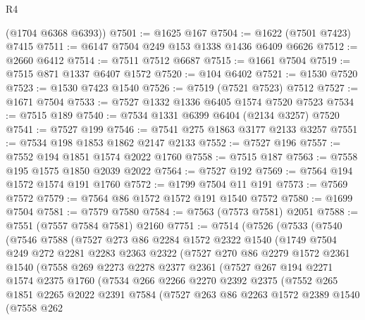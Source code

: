 \begin{lexlean}{R4}
\begin{coremodule}
      (@1704 @6368 @6393))
@7501 := @1625 @167
@7504 := @1622 (@7501 @7423) @7415
@7511 := @6147 @7504 @249 @153 @1338 @1436 @6409 @6626
@7512 := @2660 @6412
@7514 := @7511 @7512 @6687
@7515 := @1661 @7504
@7519 := @7515 @871 @1337 @6407 @1572
@7520 := @104 @6402
@7521 := @1530 @7520
@7523 := @1530 @7423 @1540
@7526 := @7519 (@7521 @7523) @7512
@7527 := @1671 @7504
@7533 := @7527 @1332 @1336 @6405 @1574 @7520 @7523
@7534 := @7515 @189
@7540 := @7534 @1331 @6399 @6404 (@2134 @3257) @7520
@7541 := @7527 @199
@7546 := @7541 @275 @1863 @3177 @2133 @3257
@7551 := @7534 @198 @1853 @1862 @2147 @2133
@7552 := @7527 @196
@7557 := @7552 @194 @1851 @1574 @2022 @1760
@7558 := @7515 @187
@7563 := @7558 @195 @1575 @1850 @2039 @2022
@7564 := @7527 @192
@7569 := @7564 @194 @1572 @1574 @191 @1760
@7572 := @1799 @7504 @11 @191
@7573 := @7569 @7572
@7579 := @7564 @86 @1572 @1572 @191 @1540 @7572
@7580 := @1699 @7504
@7581 := @7579 @7580
@7584 := @7563 (@7573 @7581) @2051
@7588 := @7551 (@7557 @7584 @7581) @2160
@7751 := @7514
    (@7526
      (@7533
        (@7540
          (@7546
            @7588
            (@7527
              @273
              @86
              @2284
              @1572
              @2322
              @1540
              (@1749
                @7504
                @249
                @272
                @2281
                @2283
                @2363
                @2322
                (@7527
                  @270
                  @86
                  @2279
                  @1572
                  @2361
                  @1540
                  (@7558
                    @269
                    @2273
                    @2278
                    @2377
                    @2361
                    (@7527
                      @267
                      @194
                      @2271
                      @1574
                      @2375
                      @1760
                      (@7534
                        @266
                        @2266
                        @2270
                        @2392
                        @2375
                        (@7552
                          @265
                          @1851
                          @2265
                          @2022
                          @2391
                          @7584
                          (@7527
                            @263
                            @86
                            @2263
                            @1572
                            @2389
                            @1540
                            (@7558
                              @262

\end{coremodule}
\end{lexlean}
